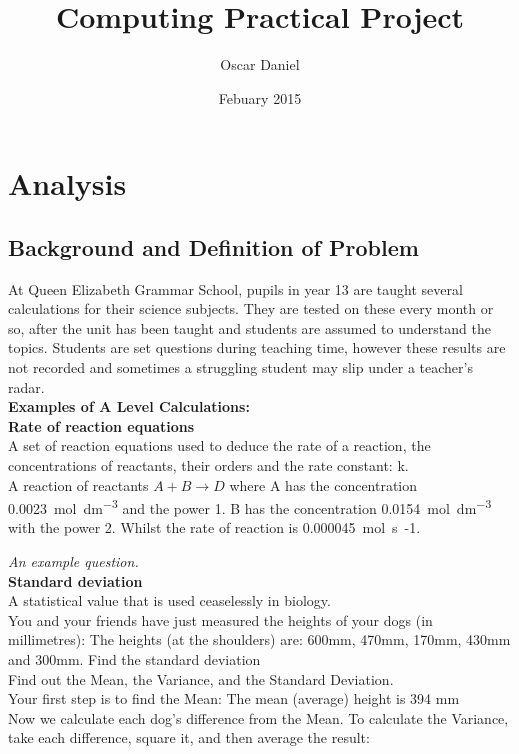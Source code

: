 \documentclass[a4paper,12pt]{report}
\title{Computing Practical Project}
\author{Oscar Daniel}
\date{Febuary 2015 }
\begin{document}
\maketitle
\tableofcontents

\chapter{Analysis}

\section{Background and Definition of Problem}
\begin{flushleft}
At Queen Elizabeth Grammar School, pupils in year 13 are taught several calculations for their science subjects. They are tested on these every month or so, after the unit has been taught and students are assumed to understand the topics. Students are set questions during teaching time, however these results are not recorded and sometimes a struggling student may slip under a teacher’s radar.
\\\textbf{Examples of A Level Calculations:}\\
\bigskip
\textbf{Rate of reaction equations}\\

A set of reaction equations used to deduce the rate of a reaction, the concentrations of reactants, their orders and the rate constant: k. \\
A reaction of reactants $A + B \rightarrow D $ where A has the concentration \SI{0.0023}{mol.dm^{-3}} and the power 1. B has the concentration \SI{0.0154}{mol.dm^{-3}}
with the power 2. Whilst the rate of reaction is \SI{0.000045}{mol.s{-1}}.

\emph{An example question.}	\\
\bigskip
\textbf{Standard deviation}\\
 A statistical value that is used ceaselessly in biology.\\
         You and your friends have just measured the heights of your dogs (in millimetres):
         The heights (at the shoulders) are: 600mm, 470mm, 170mm, 430mm and 300mm.
	Find the standard deviation\\
Find out the Mean, the Variance, and the Standard Deviation.\\
Your first step is to find the Mean:
The mean (average) height is 394 mm\\
Now we calculate each dog's difference from the Mean. To calculate the Variance, take each difference, square it, and then average the result:


\end{flushleft}
\end{document}
